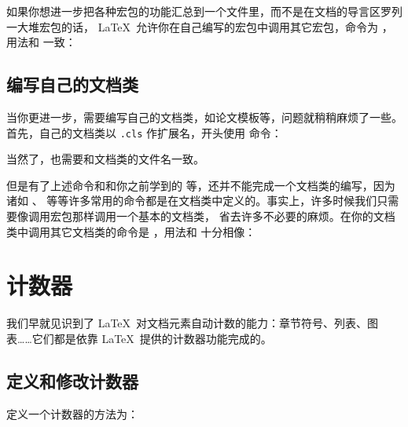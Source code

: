 如果你想进一步把各种宏包的功能汇总到一个文件里，而不是在文档的导言区罗列一大堆宏包的话，
\LaTeX\ 允许你在自己编写的宏包中调用其它宏包，命令为 ，用法和 
一致：
\begin{command}
\end{command}

\subsection{编写自己的文档类}\label{subsec:provide-cls}

当你更进一步，需要编写自己的文档类，如论文模板等，问题就稍稍麻烦了一些。首先，自己的文档类以 \texttt{.cls} 作扩展名，开头使用
 命令：
\begin{command}
\end{command}
当然了，也需要和文档类的文件名一致。

但是有了上述命令和和你之前学到的  等，还并不能完成一个文档类的编写，因为诸如 、
 等等许多常用的命令都是在文档类中定义的。事实上，许多时候我们只需要像调用宏包那样调用一个基本的文档类，
省去许多不必要的麻烦。在你的文档类中调用其它文档类的命令是  ，用法和  十分相像：
\begin{command}
\end{command}

\section{计数器}\label{sec:counters}

我们早就见识到了 \LaTeX\ 对文档元素自动计数的能力：章节符号、列表、图表……它们都是依靠 \LaTeX\ 提供的计数器功能完成的。

\subsection{定义和修改计数器}\label{subsec:count-defs}

定义一个计数器的方法为：
\begin{command}
\end{command}

